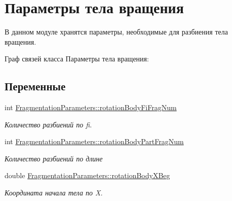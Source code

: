 \hypertarget{group__rotation_body_parameters}{}\section{Параметры тела вращения}
\label{group__rotation_body_parameters}


В данном модуле хранятся параметры, необходимые для разбиения тела вращения.  


Граф связей класса Параметры тела вращения\+:
\subsection*{Переменные}
\begin{DoxyCompactItemize}
\item 
\mbox{\label{group__rotation_body_parameters_gad70b7c7cc282797993ba0f76ef453fbc}} 
int \mbox{\hyperlink{group__rotation_body_parameters_gad70b7c7cc282797993ba0f76ef453fbc}{Fragmentation\+Parameters\+::rotation\+Body\+Fi\+Frag\+Num}}
\begin{DoxyCompactList}\small\item\em Количество разбиений по fi. \end{DoxyCompactList}\item 
\mbox{\label{group__rotation_body_parameters_gafabec4b411be9ee7e89b42b765e765aa}} 
int \mbox{\hyperlink{group__rotation_body_parameters_gafabec4b411be9ee7e89b42b765e765aa}{Fragmentation\+Parameters\+::rotation\+Body\+Part\+Frag\+Num}}
\begin{DoxyCompactList}\small\item\em Количество разбиений по длине \end{DoxyCompactList}\item 
\mbox{\label{group__rotation_body_parameters_ga1d8076cbbcfaccb02ce40b9799308bb6}} 
double \mbox{\hyperlink{group__rotation_body_parameters_ga1d8076cbbcfaccb02ce40b9799308bb6}{Fragmentation\+Parameters\+::rotation\+Body\+X\+Beg}}
\begin{DoxyCompactList}\small\item\em Координата начала тела по X. \end{DoxyCompactList}\item 
\mbox{\label{group__rotation_body_parameters_ga8507989eaebe1d60032a373a3412e75a}} 

\end{DoxyCompactItemize}
